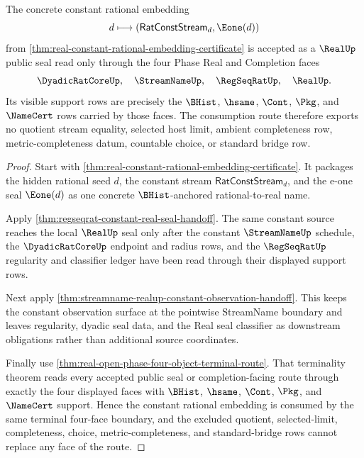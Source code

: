 \begin{theorem}
\label{thm:real-constant-embedding-terminal-four-face-consumption}
The concrete constant rational embedding
$$
d\longmapsto (\mathsf{RatConstStream}_d,\Eone(d))
$$
from \autoref{thm:real-constant-rational-embedding-certificate} is accepted
as a $\RealUp$ public seal read only through the four Phase Real and Completion
faces
$$
\DyadicRatCoreUp,\quad \StreamNameUp,\quad \RegSeqRatUp,\quad \RealUp.
$$
Its visible support rows are precisely the $\BHist$, $\hsame$, $\Cont$,
$\Pkg$, and $\NameCert$ rows carried by those faces. The consumption route
therefore exports no quotient stream equality, selected host limit, ambient
completeness row, metric-completeness datum, countable choice, or standard
bridge row.
\end{theorem}
\begin{proof}
Start with \autoref{thm:real-constant-rational-embedding-certificate}. It
packages the hidden rational seed $d$, the constant stream
$\mathsf{RatConstStream}_d$, and the e-one seal $\Eone(d)$ as one concrete
$\BHist$-anchored rational-to-real name.

Apply \autoref{thm:regseqrat-constant-real-seal-handoff}. The same constant
source reaches the local $\RealUp$ seal only after the constant
$\StreamNameUp$ schedule, the $\DyadicRatCoreUp$ endpoint and radius rows, and
the $\RegSeqRatUp$ regularity and classifier ledger have been read through
their displayed support rows.

Next apply \autoref{thm:streamname-realup-constant-observation-handoff}. This
keeps the constant observation surface at the pointwise StreamName boundary
and leaves regularity, dyadic seal data, and the Real seal classifier as
downstream obligations rather than additional source coordinates.

Finally use \autoref{thm:real-open-phase-four-object-terminal-route}. That
terminality theorem reads every accepted public seal or completion-facing
route through exactly the four displayed faces with $\BHist$, $\hsame$,
$\Cont$, $\Pkg$, and $\NameCert$ support. Hence the constant rational
embedding is consumed by the same terminal four-face boundary, and the excluded
quotient, selected-limit, completeness, choice, metric-completeness, and
standard-bridge rows cannot replace any face of the route.
\end{proof}

